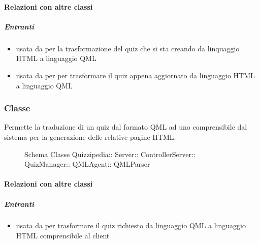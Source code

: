 \paragraph{Relazioni con altre classi}
\subparagraph{Entranti}
\begin{itemize}
\item usata da  per la trasformazione del quiz che si sta creando da linquaggio HTML a linguaggio QML
\item usata da  per per trasformare il quiz appena aggiornato da linguaggio HTML a linguaggio QML
\end{itemize}
\subsubsection{Classe }
Permette la traduzione di un quiz dal formato QML ad uno comprensibile dal sistema per la generazione delle relative pagine HTML.
\begin{figure}[H]
\centering
\noindent{}
\caption[Schema Classe QMLParser]{Schema Classe Quizzipedia:: Server:: ControllerServer:: QuizManager:: QMLAgent:: QMLParser}
\end{figure}
\paragraph{Relazioni con altre classi}
\subparagraph{Entranti}
\begin{itemize}
\item usata da  per trasformare il quiz richiesto da linguaggio QML a linguaggio HTML comprensibile al client
\end{itemize}
